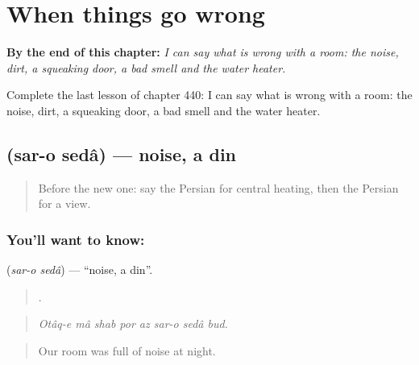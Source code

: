 
\chapter{When things go wrong}
\label{ch:fa-when-things-go-wrong}

\begin{chapteropening}
\textbf{By the end of this chapter:} \emph{I can say what is wrong with a room: the noise, dirt, a squeaking door, a bad smell and the water heater.}

Complete the last lesson of chapter 440: I can say what is wrong with a room: the noise, dirt, a squeaking door, a bad smell and the water heater.
\end{chapteropening}

\section[\texorpdfstring{\fa{سر} \fa{و} \fa{صدا} (sar-o sedâ)}{سر و صدا (sar-o sedâ)}]{   (sar-o sedâ) — noise, a din}

\label{lesson:FA-C440-sar-o-seda}



\begin{quote}
Before the new one: say the Persian for central heating, then the Persian for a view.
\end{quote}

\subsection*{You'll want to know:   }
\textbf{  } (\emph{sar-o sedâ}) — \textquotedblleft{}noise, a din\textquotedblright{}.

\begin{quote}
        .
\end{quote}

\begin{quote}
\emph{Otâq-e mâ shab por az sar-o sedâ bud.}
\end{quote}

\begin{quote}
Our room was full of noise at night.
\end{quote}

